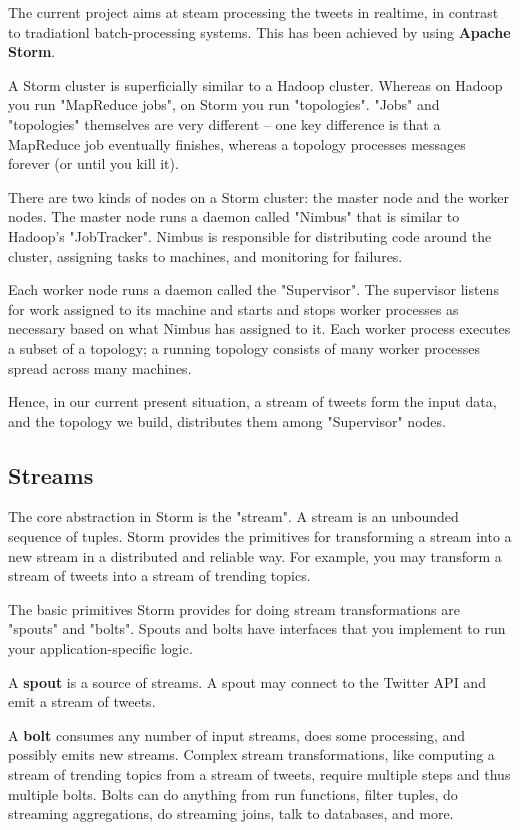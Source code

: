 \documentclass{llncs}
\begin{document}
The current project aims at steam processing the tweets in realtime, in contrast to tradiationl batch-processing systems. This has been achieved by using \textbf{Apache Storm}.

A Storm cluster is superficially similar to a Hadoop cluster. Whereas on Hadoop you run "MapReduce jobs", on Storm you run "topologies". "Jobs" and "topologies" themselves are very different -- one key difference is that a MapReduce job eventually finishes, whereas a topology processes messages forever (or until you kill it).

There are two kinds of nodes on a Storm cluster: the master node and the worker nodes. The master node runs a daemon called "Nimbus" that is similar to Hadoop's "JobTracker". Nimbus is responsible for distributing code around the cluster, assigning tasks to machines, and monitoring for failures.

Each worker node runs a daemon called the "Supervisor". The supervisor listens for work assigned to its machine and starts and stops worker processes as necessary based on what Nimbus has assigned to it. Each worker process executes a subset of a topology; a running topology consists of many worker processes spread across many machines.

Hence, in our current present situation, a stream of tweets form the input data, and the topology we build, distributes them among "Supervisor" nodes.

\subsection{Streams}
The core abstraction in Storm is the "stream". A stream is an unbounded sequence of tuples. Storm provides the primitives for transforming a stream into a new stream in a distributed and reliable way. For example, you may transform a stream of tweets into a stream of trending topics.

The basic primitives Storm provides for doing stream transformations are "spouts" and "bolts". Spouts and bolts have interfaces that you implement to run your application-specific logic.

A \textbf{spout} is a source of streams. A spout may connect to the Twitter API and emit a stream of tweets.

A \textbf{bolt} consumes any number of input streams, does some processing, and possibly emits new streams. Complex stream transformations, like computing a stream of trending topics from a stream of tweets, require multiple steps and thus multiple bolts. Bolts can do anything from run functions, filter tuples, do streaming aggregations, do streaming joins, talk to databases, and more. \\
\end{document}
